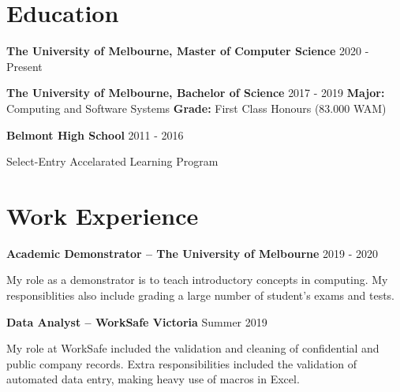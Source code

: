 \documentclass[10pt]{article}
\begin{document}
\begin{minipage}[t]{.60\textwidth}
\vspace*{0pt}

\section{Education}

\textbf{The University of Melbourne, Master of Computer Science} \newline
{\footnotesize 2020 - Present} \newline

\medskip

\textbf{The University of Melbourne, Bachelor of Science} \newline
{\footnotesize 2017 - 2019} \newline
\textbf{Major:} Computing and Software Systems \newline
\textbf{Grade:} First Class Honours (83.000 WAM) \newline

\medskip

\textbf{Belmont High School} \newline
{\footnotesize 2011 - 2016}
\begin{flushleft}
Select-Entry Accelarated Learning Program 
\end{flushleft}

\bigskip

\section{Work Experience}

\textbf{Academic Demonstrator -- The University of Melbourne} \newline
{\footnotesize 2019 - 2020}
\begin{flushleft}
My role as a demonstrator is to teach introductory concepts in computing.
My responsiblities also include grading a large number of student's exams and tests. \newline
\end{flushleft}

\medskip

\textbf{Data Analyst -- WorkSafe Victoria} \newline
{\footnotesize Summer 2019}
\begin{flushleft}
My role at WorkSafe included the validation and cleaning of confidential and public company records. 
Extra responsibilities included the validation of automated data entry, making heavy use of macros in Excel. \newline
\end{flushleft} 


\end{minipage}
\end{document}
